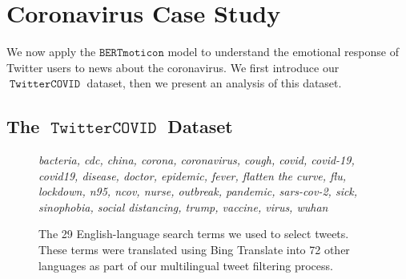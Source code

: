 \documentclass[11pt]{article}
\newcommand{\bertmoji}{\texttt{BERTmoticon}}
\DeclareMathOperator{\corona}{\texttt{TwitterCOVID}}
\begin{document}

\section{Coronavirus Case Study}
\label{sec:casestudy}

We now apply the $\bertmoji$ model to understand the emotional response of Twitter users to news about the coronavirus.
We first introduce our $\corona$ dataset,
then we present an analysis of this dataset.

\subsection{The $\corona$ Dataset}

\begin{figure}
    \footnotesize
    \emph{%
    bacteria,
    cdc,
    china,
    corona,
    coronavirus,
    cough,
    covid,
    covid-19,
    covid19,
    disease,
    doctor,
    epidemic,
    fever,
    flatten the curve,
    flu,
    lockdown,
    n95,
    ncov,
    nurse,
    outbreak,
    pandemic,
    sars-cov-2,
    sick,
    sinophobia,
    social distancing,
    trump,
    vaccine,
    virus,
    wuhan
}
    \caption{
        The 29 English-language search terms we used to select tweets.
        These terms were translated using Bing Translate into 72 other languages as part of our multilingual tweet filtering process.
    }
    \label{fig:terms}
\end{figure}
\end{document}
